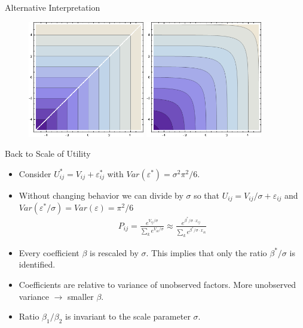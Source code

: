 \documentclass[xcolor=pdftex,dvipsnames,table,mathserif]{beamer}
\begin{document}
\begin{frame}{Alternative Interpretation}
\begin{figure}[htbp]
\begin{center}
\includegraphics[width=2in]{hardmax.png}
\includegraphics[width=2in]{softmax.png}
\end{center}
\end{figure}
\end{frame}

\begin{frame}{Back to Scale of Utility}
\begin{itemize}
\item Consider $U_{ij}^{*} = V_{ij} + \varepsilon_{ij}^{*}$ with $Var(\varepsilon^{*}) = \sigma^2 \pi^2/6$.
\item Without changing behavior we can divide by $\sigma$ so that $U_{ij} = V_{ij}/\sigma + \varepsilon_{ij}$ and $Var(\varepsilon^{*}/\sigma)=Var(\varepsilon) = \pi^2/6$
\begin{eqnarray*}
P_{ij} = \frac{e^{V_{ij}/\sigma}}{\sum_k e^{V_{ik}/\sigma}} \approx \frac{e^{\beta^{*}/\sigma \cdot x_{ij}}}{\sum_k e^{\beta^{*}/\sigma \cdot x_{ik}}}
\end{eqnarray*}
\item Every coefficient $\beta$ is rescaled by $\sigma$. This implies that only the ratio $\beta^{*}/\sigma$ is identified. 
\item Coefficients are relative to variance of unobserved factors. More unobserved variance $\longrightarrow$ smaller $\beta$.
\item Ratio $\beta_1/\beta_2$ is invariant to the scale parameter $\sigma$.
\end{itemize}
\end{frame}
\end{document}
